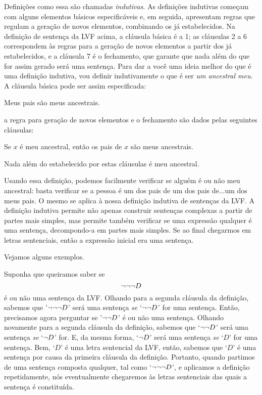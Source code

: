 Definições como essa são chamadas \emph{indutivas}.
As definições indutivas começam com alguns elementos básicos especificáveis e, em seguida, apresentam regras que regulam a geração de novos elementos, combinando os já estabelecidos.
Na definição de sentença da LVF acima, a cláusula básica é a 1; as cláusulas 2 a 6 correspondem às regras para a geração de novos elementos a partir dos já estabelecidos, e a cláusula 7 é o fechamento, que garante que nada além do que for assim gerado será uma sentença.
Para dar a você uma ideia melhor do que é uma definição indutiva, vou definir indutivamente o que é ser \emph{um ancestral meu}.
A cláusula básica pode ser assim especificada:
	\begin{ebullet}
		\item Meus pais são meus ancestrais.
	\end{ebullet}
a regra para geração de novos elementos e o fechamento são dados pelas seguintes cláusulas:
	\begin{ebullet}
		\item Se $x$ é meu ancestral, então os pais de $x$ são meus ancestrais.
		\item Nada além do estabelecido por estas cláusulas é meu ancestral.
	\end{ebullet}
Usando essa definição, podemos facilmente verificar se alguém é ou não meu ancestral:
basta verificar se a pessoa é um dos pais de um dos pais de...um dos meus pais.
O mesmo se aplica à nossa definição indutiva de sentenças da LVF.
A definição indutiva permite não apenas construir sentenças complexas a partir de partes mais simples, mas permite também verificar se uma expressão qualquer é uma sentença, decompondo-a em partes mais simples. Se ao final chegarmos em letras sentenciais, então a expressão inicial era uma sentença.

Vejamos alguns exemplos.

Suponha que queiramos saber se
$$\neg\neg\neg D$$
é ou não uma sentença da LVF.
Olhando para a segunda cláusula da definição, sabemos que '$\neg\neg\neg D$' será uma sentença \emph{se} `$\neg\neg D$' for uma sentença.
Então, precisamos agora perguntar se '$\neg\neg D$' é ou não uma sentença.
Olhando novamente para a segunda cláusula da definição, sabemos que `$\neg\neg D$' será uma sentença \emph{se} `$\neg D$' for.
E, da mesma forma, `$\neg D$' será uma sentença \emph{se} `$D$' for uma sentença.
Bem, `$D$' é uma letra sentencial da LVF, então, sabemos que `$D$' é uma sentença por causa da primeira cláusula da definição.
Portanto, quando partimos de uma sentença composta qualquer, tal como `$\neg\neg\neg D$', e aplicamos a definição repetidamente, nós eventualmente chegaremos às letras sentenciais das quais a sentença é constituída.

